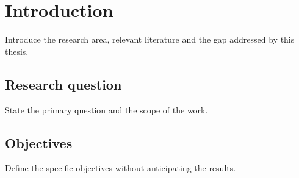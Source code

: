 \chapter{Introduction}
\label{chap:introduction}
Introduce the research area, relevant literature and the gap addressed by this thesis.
\section{Research question}
State the primary question and the scope of the work.
\section{Objectives}
Define the specific objectives without anticipating the results.

